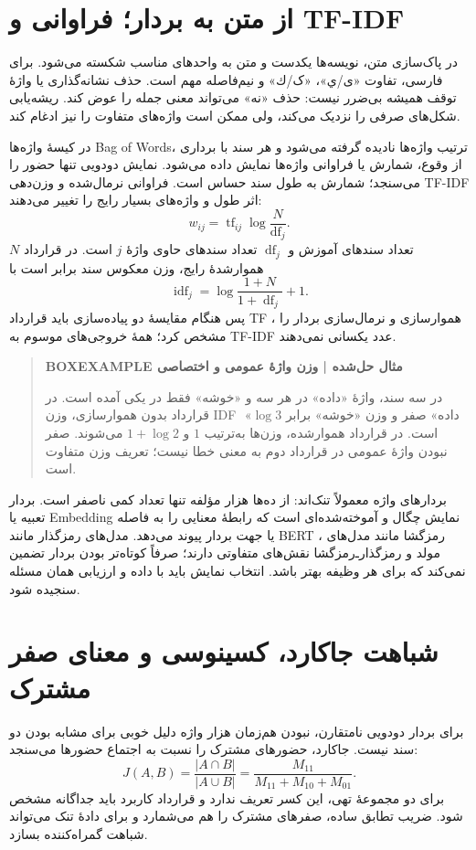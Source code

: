 \section{از متن به بردار؛ فراوانی و TF-IDF}
در پاک‌سازی متن، نویسه‌ها یکدست و متن به واحدهای مناسب شکسته می‌شود. برای فارسی، تفاوت «ی/ي»، «ک/ك» و نیم‌فاصله مهم است. حذف نشانه‌گذاری یا واژهٔ توقف همیشه بی‌ضرر نیست: حذف «نه» می‌تواند معنی جمله را عوض کند. ریشه‌یابی شکل‌های صرفی را نزدیک می‌کند، ولی ممکن است واژه‌های متفاوت را نیز ادغام کند.

در کیسهٔ واژه‌ها Bag of Words، ترتیب واژه‌ها نادیده گرفته می‌شود و هر سند با برداری از وقوع، شمارش یا فراوانی واژه‌ها نمایش داده می‌شود. نمایش دودویی تنها حضور را می‌سنجد؛ شمارش به طول سند حساس است. فراوانی نرمال‌شده و وزن‌دهی TF-IDF اثر طول و واژه‌های بسیار رایج را تغییر می‌دهند:
\[w_{ij}=\operatorname{tf}_{ij}\log\frac{N}{\operatorname{df}_j}.\]
$N$ تعداد سندهای آموزش و $\operatorname{df}_j$ تعداد سندهای حاوی واژهٔ $j$ است. در قرارداد هموارشدهٔ رایج، وزن معکوس سند برابر است با
\[\operatorname{idf}_j=\log\frac{1+N}{1+\operatorname{df}_j}+1.\]
پس هنگام مقایسهٔ دو پیاده‌سازی باید قرارداد TF ، هموارسازی و نرمال‌سازی بردار را مشخص کرد؛ همهٔ خروجی‌های موسوم به TF-IDF عدد یکسانی نمی‌دهند.

\begin{quote}\textbf{BOXEXAMPLE مثال حل‌شده | وزن واژهٔ عمومی و اختصاصی}\par 
در سه سند، واژهٔ «داده» در هر سه و «خوشه» فقط در یکی آمده است. در قرارداد بدون هموارسازی، وزن IDF ِ «داده» صفر و وزن «خوشه» برابر $\log3$ است. در قرارداد هموارشده، وزن‌ها به‌ترتیب $1$ و $1+\log2$ می‌شوند. صفر نبودن واژهٔ عمومی در قرارداد دوم به معنی خطا نیست؛ تعریف وزن متفاوت است.
\end{quote}

بردارهای واژه معمولاً تنک‌اند: از ده‌ها هزار مؤلفه تنها تعداد کمی ناصفر است. بردار تعبیه یا Embedding نمایش چگال و آموخته‌شده‌ای است که رابطهٔ معنایی را به فاصله یا جهت بردار پیوند می‌دهد. مدل‌های رمزگذار مانند BERT ، رمزگشا مانند مدل‌های مولد و رمزگذارـ‌رمزگشا نقش‌های متفاوتی دارند؛ صرفاً کوتاه‌تر بودن بردار تضمین نمی‌کند که برای هر وظیفه بهتر باشد. انتخاب نمایش باید با داده و ارزیابی همان مسئله سنجیده شود.

\section{شباهت جاکارد، کسینوسی و معنای صفر مشترک}
برای بردار دودویی نامتقارن، نبودن هم‌زمان هزار واژه دلیل خوبی برای مشابه بودن دو سند نیست. جاکارد، حضورهای مشترک را نسبت به اجتماع حضورها می‌سنجد:
\[J(A,B)=\frac{|A\cap B|}{|A\cup B|}=\frac{M_{11}}{M_{11}+M_{10}+M_{01}}.\]
برای دو مجموعهٔ تهی، این کسر تعریف ندارد و قرارداد کاربرد باید جداگانه مشخص شود. ضریب تطابق ساده، صفرهای مشترک را هم می‌شمارد و برای دادهٔ تنک می‌تواند شباهت گمراه‌کننده بسازد.

